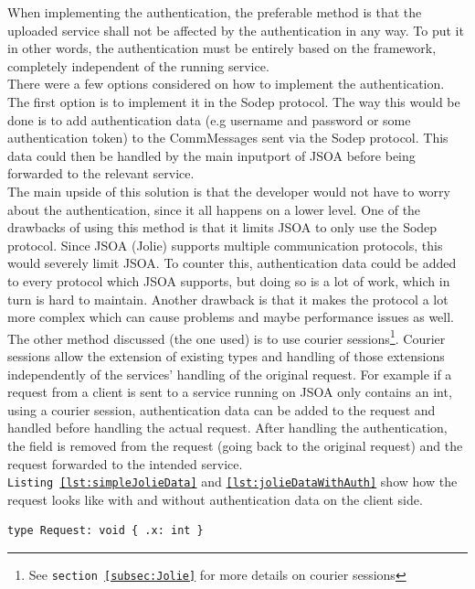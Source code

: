 \documentclass[12pt,a4paper]{article}
\begin{document}
When implementing the authentication, the preferable method is that the uploaded service shall not be affected by the authentication in any way. To put it in other words, the authentication must be entirely based on the framework, completely independent of the running service. \\

There were a few options considered on how to implement the authentication. \\
The first option is to implement it in the Sodep protocol. The way this would be done is to add authentication data (e.g username and password or some authentication token) to the CommMessages sent via the Sodep protocol. This data could then be handled by the main inputport of JSOA before being forwarded to the relevant service. \\
The main upside of this solution is that the developer would not have to worry  about the authentication, since it all happens on a lower level. One of the drawbacks of using this method is that it limits JSOA to only use the Sodep protocol. Since JSOA (Jolie) supports multiple communication protocols\cite{jolie_protocols}, this would severely limit JSOA. To counter this, authentication data could be added to every protocol which JSOA supports, but doing so is a lot of work, which in turn is hard to maintain. Another drawback is that it makes the protocol a lot more complex which can cause problems and maybe performance issues as well. \\

The other method discussed (the one used) is to use courier sessions\footnote{See \texttt{section \ref{subsec:Jolie}} for more details on courier sessions}. Courier sessions allow the extension of existing types and handling of those extensions independently of the services' handling of the original request. For example if a request from a client is sent to a service running on JSOA only contains an int, using a courier session, authentication data can be added to the request and handled before handling the actual request. After handling the authentication, the field is removed from the request (going back to the original request) and the request forwarded to the intended service. \\
\texttt{Listing \ref{lst:simpleJolieData}} and \texttt{\ref{lst:jolieDataWithAuth}} show how the request looks like with and without authentication data on the client side.
\begin{lstlisting}[caption={Simple Jolie data},label={lst:simpleJolieData}]
type Request: void { .x: int }
\end{lstlisting}
\end{document}
